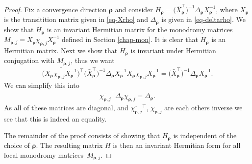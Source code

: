 \begin{proof}
Fix a convergence direction $\bm\rho$ and consider $H_{\bm\rho} = \big(\bar{X}_{\bm\rho}^{\intercal}\big)^{-1} \Delta_{\bm\rho} X_{\bm\rho}^{-1}$, where $X_{\bm{\rho}}$ is the transitition matrix given in \eqref{eq-Xrho} and $\Delta_{\bm\rho}$ is given in \eqref{eq-deltarho}. We show that $H_{\bm\rho}$ is an invariant Hermitian matrix for the monodromy matrices $M_{\bm\rho,j} = X_{\bm\rho} \chi_{\bm\rho,j} X_{\bm\rho}^{-1}$ defined in Section \ref{chap-mon}. It is clear that $H_{\bm\rho}$ is an Hermitian matrix. Next we show that $H_{\bm\rho}$ is invariant under Hermitian conjugation with $M_{\bm\rho,j}$, thus we want
\begin{gather*}
\big(\overline{X_{\bm\rho} \chi_{\bm\rho,j} X_{\bm\rho}^{-1}}\big)^{\intercal}\big(\bar{X}_{\bm\rho}^{\intercal}\big)^{-1} \Delta_{\bm\rho} X_{\bm\rho}^{-1} X_{\bm\rho} \chi_{\bm\rho,j} X_{\bm\rho}^{-1} = \big(\bar{X}_{\bm\rho}^{\intercal}\big)^{-1} \Delta_{\bm\rho} X_{\bm\rho}^{-1}.
\end{gather*}
We can simplify this into
\begin{gather*}
\overline{\chi_{\bm\rho,j}}^{\intercal}\Delta_{\bm\rho} \chi_{\bm\rho,j} = \Delta_{\bm\rho}.
\end{gather*}
As all of these matrices are diagonal, and $\overline{\chi_{\bm\rho,j}}^{\intercal}$,
$\chi_{\bm\rho,j}$ are each others inverse we see that this is indeed an equality.

The remainder of the proof consists of showing that $H_{\bm\rho}$ is independent of the
choice of $\bm\rho$. The resulting matrix $H$ is then an invariant Hermitian form for all
local monodromy matrices~$M_{\bm\rho,j}$.


\end{proof}
